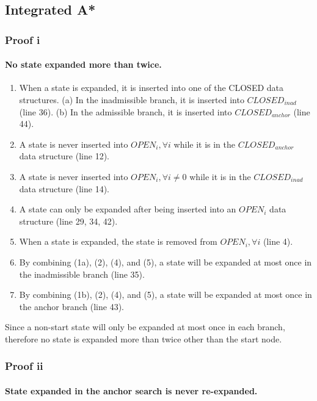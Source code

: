 \documentclass[11pt,draft]{article}
\begin{document}
\subsection{Integrated A*}
\subsubsection{Proof i}
\paragraph{No state expanded more than twice.}
\begin{enumerate}
    \item When a state is expanded, it is inserted into one of the CLOSED data structures. (a) In the inadmissible branch, it is inserted into $CLOSED_{inad}$ (line 36). (b) In the admissible branch, it is inserted into $CLOSED_{anchor}$ (line 44).
    \item A state is never inserted into $OPEN_i, \forall i$ while it is in the $CLOSED_{anchor}$ data structure (line 12).
    \item A state is never inserted into $OPEN_i, \forall i \neq 0$ while it is in the $CLOSED_{inad}$ data structure (line 14).
    \item A state can only be expanded after being inserted into an $OPEN_i$ data structure (line 29, 34, 42).
    \item When a state is expanded, the state is removed from $OPEN_i, \forall i$ (line 4).
    \item By combining (1a), (2), (4), and (5), a state will be expanded at most once in the inadmissible branch (line 35).
    \item By combining (1b), (2), (4), and (5), a state will be expanded at most once in the anchor branch (line 43).
\end{enumerate}
 Since a non-start state will only be expanded at most once in each branch, therefore no state is expanded more than twice other than the start node.

\subsubsection{Proof ii}
\paragraph{State expanded in the anchor search is never re-expanded.}
\end{document}
